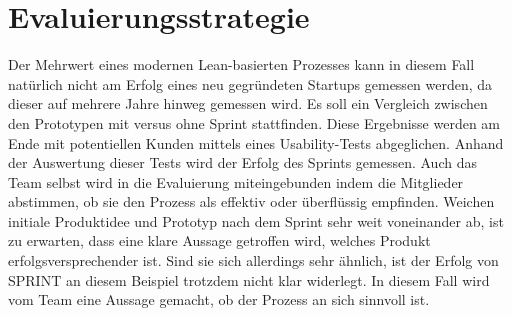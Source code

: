 \section{Evaluierungsstrategie}
Der Mehrwert eines modernen Lean-basierten Prozesses kann in diesem Fall natürlich nicht am Erfolg eines neu gegründeten Startups gemessen werden, da dieser auf mehrere Jahre hinweg gemessen wird. Es soll ein Vergleich zwischen den Prototypen mit versus ohne Sprint stattfinden. Diese Ergebnisse werden am Ende mit potentiellen Kunden mittels eines Usability-Tests abgeglichen. Anhand der Auswertung dieser Tests wird der Erfolg des Sprints gemessen. Auch das Team selbst wird in die Evaluierung miteingebunden indem die Mitglieder abstimmen, ob sie den Prozess als effektiv oder überflüssig empfinden.
Weichen initiale Produktidee und Prototyp nach dem Sprint sehr weit voneinander ab, ist zu erwarten, dass eine klare Aussage getroffen wird, welches Produkt erfolgsversprechender ist. Sind sie sich allerdings sehr ähnlich, ist der Erfolg von SPRINT an diesem Beispiel trotzdem nicht klar widerlegt. In diesem Fall wird vom Team eine Aussage gemacht, ob der Prozess an sich sinnvoll ist. 





